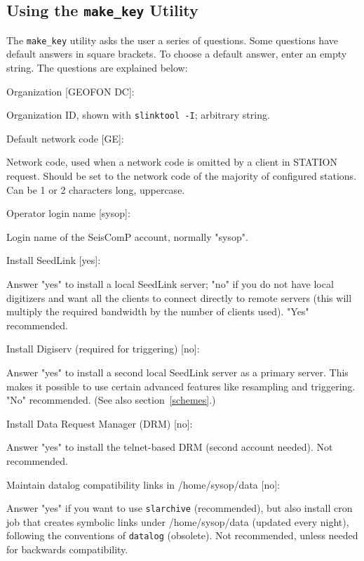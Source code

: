 \documentclass[11pt,a4paper,titlepage]{article}
\begin{document}
\subsection{Using the \texttt{make\_key} Utility}\label{makekey}

The \verb+make_key+ utility asks the user a series of questions. Some
questions have default answers in square brackets. To choose a default
answer, enter an empty string. The questions are explained below:
\begin{interface}
\item Organization [GEOFON DC]:

Organization ID, shown with \verb+slinktool -I+; arbitrary string.

\item Default network code [GE]:

Network code, used when a network code is omitted by a client in
STATION request. Should be set to the network code of the majority of
configured stations. Can be 1 or 2 characters long, uppercase.

\item Operator login name [sysop]:

Login name of the SeisComP account, normally "sysop".

\item Install SeedLink [yes]:

Answer "yes" to install a local SeedLink server; "no" if you do not
have local digitizers and want all the clients to connect directly to
remote servers (this will multiply the required bandwidth by the
number of clients used). "Yes" recommended.

\item Install Digiserv (required for triggering) [no]:

Answer "yes" to install a second local SeedLink server as a primary
server. This makes it possible to use certain advanced features like
resampling and triggering. "No" recommended. (See also
section~\ref{schemes}.)

\item Install Data Request Manager (DRM) [no]:

Answer "yes" to install the telnet-based DRM (second account needed). Not
recommended.

\item Maintain datalog compatibility links in /home/sysop/data [no]:

Answer "yes" if you want to use \verb+slarchive+ (recommended), but also
install cron job that creates symbolic links under /home/sysop/data
(updated every night), following the conventions of \verb+datalog+
(obsolete). Not recommended, unless needed for backwards compatibility.


\end{interface}
\end{document}
